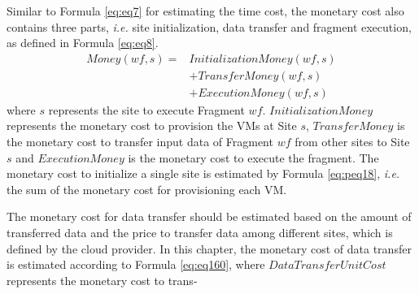 Similar to Formula \ref{eq:eq7} for estimating the time cost, the monetary cost also contains three parts, \textit{i.e.} site initialization, data transfer and fragment execution, as defined in Formula \ref{eq:eq8}.
\begin{equation}\label{eq:eq8}
\boxed{
\begin{split}
Money(wf, s) = & InitializationMoney( wf, s ) \\&+ TransferMoney( wf, s ) \\&+ ExecutionMoney( wf,s )
\end{split}
}
\end{equation}
where $s$ represents the site to execute Fragment $wf$. $InitializationMoney$ represents the monetary cost to provision the VMs at Site $s$, $TransferMoney$ is the monetary cost to transfer input data of Fragment $wf$ from other sites to Site $s$ and $ExecutionMoney$ is the monetary cost to execute the fragment.
The monetary cost to initialize a single site is estimated by Formula \ref{eq:peq18}, \textit{i.e.} the sum of the monetary cost for provisioning each VM.


The monetary cost for data transfer should be estimated based on the amount of transferred data and the price to transfer data among different sites, which is defined by the cloud provider. In this chapter, the monetary cost of data transfer is estimated according to Formula \ref{eq:eq160}, where $DataTransferUnitCost$ represents the monetary cost to trans-

